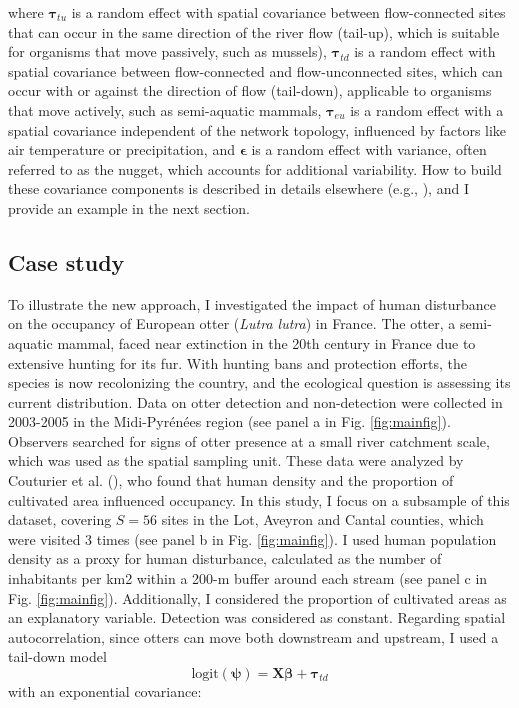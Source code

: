 \documentclass[
  11pt,
  a4paper,
]{article}
\begin{document}
where \(\boldsymbol{\tau}_{tu}\) is a random effect with spatial covariance between flow-connected sites that can occur in the same direction of the river flow (tail-up), which is suitable for organisms that move passively, such as mussels), \(\boldsymbol{\tau}_{td}\) is a random effect with spatial covariance between flow-connected and flow-unconnected sites, which can occur with or against the direction of flow (tail-down), applicable to organisms that move actively, such as semi-aquatic mammals, \(\boldsymbol{\tau}_{eu}\) is a random effect with a spatial covariance independent of the network topology, influenced by factors like air temperature or precipitation, and \(\boldsymbol{\epsilon}\) is a random effect with variance, often referred to as the nugget, which accounts for additional variability. How to build these covariance components is described in details elsewhere (e.g., ), and I provide an example in the next section.

\subsection{Case study}\label{case-study}

To illustrate the new approach, I investigated the impact of human disturbance on the occupancy of European otter (\emph{Lutra lutra}) in France. The otter, a semi-aquatic mammal, faced near extinction in the 20th century in France due to extensive hunting for its fur. With hunting bans and protection efforts, the species is now recolonizing the country, and the ecological question is assessing its current distribution. Data on otter detection and non-detection were collected in 2003-2005 in the Midi-Pyrénées region (see panel a in Fig. \ref{fig:mainfig}). Observers searched for signs of otter presence at a small river catchment scale, which was used as the spatial sampling unit. These data were analyzed by Couturier et al. (), who found that human density and the proportion of cultivated area influenced occupancy. In this study, I focus on a subsample of this dataset, covering \(S = 56\) sites in the Lot, Aveyron and Cantal counties, which were visited 3 times (see panel b in Fig. \ref{fig:mainfig}). I used human population density as a proxy for human disturbance, calculated as the number of inhabitants per km2 within a 200-m buffer around each stream (see panel c in Fig. \ref{fig:mainfig}). Additionally, I considered the proportion of cultivated areas as an explanatory variable. Detection was considered as constant. Regarding spatial autocorrelation, since otters can move both downstream and upstream, I used a tail-down model \[\text{logit}(\boldsymbol{\psi}) = \mathbf{X} \boldsymbol{\beta} +\boldsymbol{\tau}_{td}\] with an exponential covariance:
\end{document}
